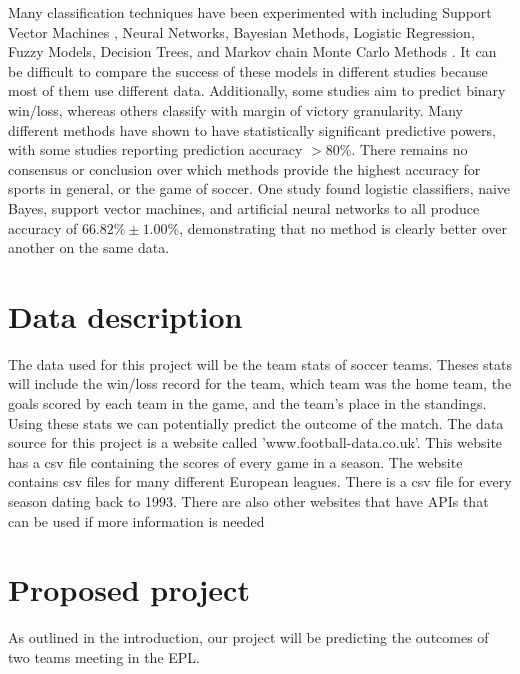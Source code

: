\documentclass[conference]{IEEEtran}
\begin{document}
 Many classification techniques have been experimented with including Support Vector Machines \cite{Cao:2012aa}, Neural Networks\cite{McCabe:2008aa}, Bayesian Methods\cite{Buursma:2011aa}, Logistic Regression\cite{Cao:2012aa,Buursma:2011aa}, Fuzzy Models\cite{Trawinski:2010aa}, Decision Trees\cite{Zdravevski:2010aa}, and Markov chain Monte Carlo Methods \cite{Rue:2000aa}. It can be difficult to compare the success of these models in different studies because most of them use different data. Additionally, some studies aim to predict binary win/loss, whereas others \cite{Rotshtein:2005aa} classify with margin of victory granularity. Many different methods have shown to have statistically significant predictive powers, with some studies reporting prediction accuracy $>80\%$\cite{Ivankovic:2010aa}. There remains no consensus or conclusion over which methods provide the highest accuracy for sports in general, or the game of soccer. One study \cite{Cao:2012aa} found logistic classifiers, naive Bayes, support vector machines, and artificial neural networks to all produce accuracy of $66.82\% \pm 1.00\%$, demonstrating that no method is clearly better over another on the same data.






\section{Data description}
The data used for this project will be the team stats of soccer teams. Theses stats will include the win/loss record for the team, which team was the home team, the goals scored by each team in the game, and the team's place in the standings. Using these stats we can potentially predict the outcome of the match.
The data source for this project is a website called 'www.football-data.co.uk'\cite{football_data}. This website has a csv file containing the scores of every game in a season. The website contains csv files for many different European leagues. There is a csv file for every season dating back to 1993. There are also other websites that have APIs that can be used if more information is needed

\section{Proposed project}
As outlined in the introduction, our project will be predicting the outcomes of two teams meeting in the EPL.
\end{document}
